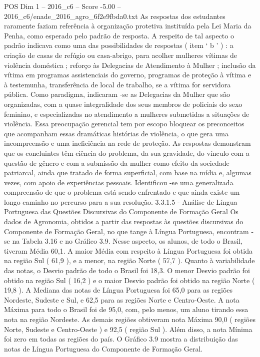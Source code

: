 \begin{textsample}{POS Dim 1 – 2016\_c6 – Score -5.00 – 2016\_c6/enade\_2016\_agro\_6f2e9fbda0.txt}
As respostas dos estudantes raramente faziam referência à organização protetiva instituída pela Lei Maria da Penha, como esperado pelo padrão de resposta.
A respeito de tal aspecto o padrão indicava como uma das possibilidades de respostas ( item ‘ b ’ ) : a criação de casas de refúgio ou casa-abrigo, para acolher mulheres vítimas de violência doméstica ; reforço às Delegacias de Atendimento à Mulher ; inclusão da vítima em programas assistenciais do governo, programas de proteção à vítima e à testemunha, transferência de local de trabalho, se a vítima for servidora pública.
Como paradigma, indicaram -se as Delegacias da Mulher que são organizadas, com a quase integralidade dos seus membros de policiais do sexo feminino, e especializadas no atendimento a mulheres submetidas a situações de violência.
Essa preocupação gerencial tem por escopo bloquear os preconceitos que acompanham essas dramáticas histórias de violência, o que gera uma incompreensão e uma ineficiência na rede de proteção.
As respostas demonstram que os concluintes têm ciência do problema, da sua gravidade, do vínculo com a questão de gênero e com a submissão da mulher como efeito da sociedade patriarcal, ainda que tratado de forma superficial, com base na mídia e, algumas vezes, com apoio de experiências pessoais.
Identificou -se uma generalizada compreensão de que o problema está sendo enfrentado e que ainda existe um longo caminho no percurso para a sua resolução. 3.3.1.5 - Análise de Língua Portuguesa das Questões Discursivas do Componente de Formação Geral Os dados de Agronomia, obtidos a partir das respostas às questões discursivas do Componente de Formação Geral, no que tange à Língua Portuguesa, encontram -se na Tabela 3.16 e no Gráfico 3.9.
Nesse aspecto, os alunos, de todo o Brasil, tiveram Média 60,1.
A maior Média com respeito à Língua Portuguesa foi obtida na região Sul ( 61,9 ), e a menor, na região Norte ( 57,7 ).
Quanto à variabilidade das notas, o Desvio padrão de todo o Brasil foi 18,3.
O menor Desvio padrão foi obtido na região Sul ( 16,2 ) e o maior Desvio padrão foi obtido na região Norte ( 19,8 ).
A Mediana das notas de Língua Portuguesa foi 65,0 para as regiões Nordeste, Sudeste e Sul, e 62,5 para as regiões Norte e Centro-Oeste.
A nota Máxima para todo o Brasil foi de 95,0, com, pelo menos, um aluno tirando essa nota na região Nordeste.
As demais regiões obtiveram nota Máxima 90,0 ( regiões Norte, Sudeste e Centro-Oeste ) e 92,5 ( região Sul ).
Além disso, a nota Mínima foi zero em todas as regiões do país.
O Gráfico 3.9 mostra a distribuição das notas de Língua Portuguesa do Componente de Formação Geral.

\end{textsample}
